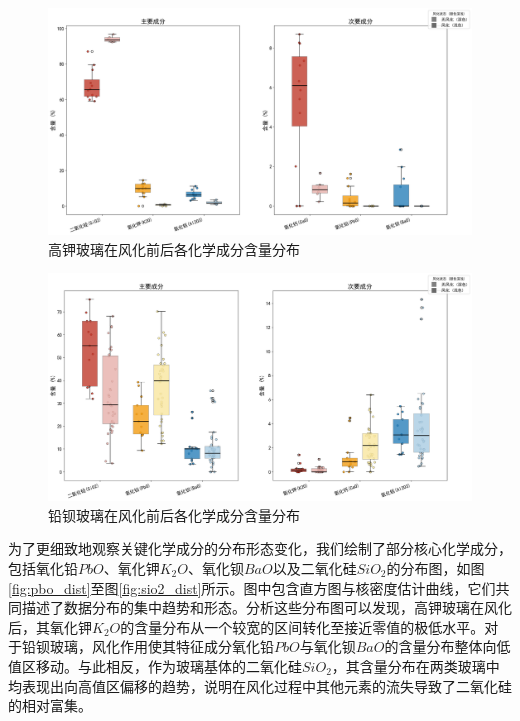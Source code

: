 \begin{figure}[H]
	\centering
	\includegraphics[width=\textwidth]{figs/3问题一/高钾玻璃成分分布.png}
	\caption{高钾玻璃在风化前后各化学成分含量分布}
	\label{fig:高钾玻璃成分分布}
\end{figure}

\begin{figure}[H]
	\centering
	\includegraphics[width=\textwidth]{figs/3问题一/铅钡玻璃成分分布.png}
	\caption{铅钡玻璃在风化前后各化学成分含量分布}
	\label{fig:铅钡玻璃成分分布}
\end{figure}


为了更细致地观察关键化学成分的分布形态变化，我们绘制了部分核心化学成分，包括氧化铅$PbO$、氧化钾$K_2O$、氧化钡$BaO$以及二氧化硅$SiO_2$的分布图，如图\ref{fig:pbo_dist}至图\ref{fig:sio2_dist}所示。图中包含直方图与核密度估计曲线，它们共同描述了数据分布的集中趋势和形态。分析这些分布图可以发现，高钾玻璃在风化后，其氧化钾$K_2O$的含量分布从一个较宽的区间转化至接近零值的极低水平。对于铅钡玻璃，风化作用使其特征成分氧化铅$PbO$与氧化钡$BaO$的含量分布整体向低值区移动。与此相反，作为玻璃基体的二氧化硅$SiO_2$，其含量分布在两类玻璃中均表现出向高值区偏移的趋势，说明在风化过程中其他元素的流失导致了二氧化硅的相对富集。


